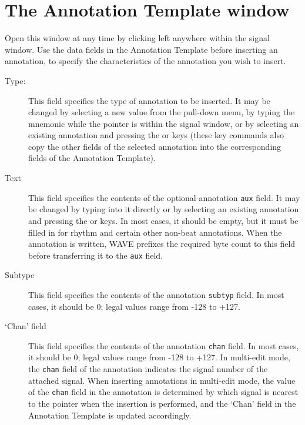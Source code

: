 \documentclass[twoside]{book}
\newcommand{\keycap}[1]{\cornersize{.5}\Ovalbox{\small\sf #1}}
\newcommand{\amenubutton}[1]{{\sf #1}~\keycap{\ensuremath{\nabla}}}
\newcommand{\WAVE}{{\sf WAVE}\xspace}
\begin{document}
\section{The {\sf Annotation Template} window}

\begin{figure}[h]
\centerline{}
\end{figure}
\label{sec:annotation-template-window}
Open this window at any time by clicking left anywhere within the
signal window.  Use the data fields in the {\sf Annotation Template}
before inserting an annotation, to specify the characteristics of the
annotation you wish to insert.

\begin{description}
\item[\amenubutton{Type:}]
This field specifies the type of annotation to be inserted.  It may be changed
by selecting a new value from the pull-down menu, by typing the mnemonic while
the pointer is within the signal window, or by selecting an existing annotation
and pressing the \keycap{Copy} or \keycap{F6} keys (these key commands also
copy the other fields of the selected annotation into the corresponding fields
of the {\sf Annotation Template}).

\item[{\sf Text}]
This field specifies the contents of the optional annotation {\tt aux} field.
It may be changed by typing into it directly or by selecting an existing
annotation and pressing the \keycap{Copy} or \keycap{F6} keys.  In most cases,
it should be empty, but it must be filled in for rhythm and certain other
non-beat annotations.  When the annotation is written, \WAVE{} prefixes the
required byte count to this field before transferring it to the {\tt aux}
field.

\item[{\sf Subtype}]
This field specifies the contents of the annotation {\tt subtyp} field.  In
most cases, it should be 0; legal values range from -128 to +127.

\item[{\sf `Chan' field}]
This field specifies the contents of the annotation {\tt chan} field.  In most
cases, it should be 0; legal values range from -128 to +127.  In multi-edit
mode, the {\tt chan} field of the annotation indicates the signal number of
the attached signal.  When inserting annotations in multi-edit mode, the value
of the {\tt chan} field in the annotation is determined by which signal is
nearest to the pointer when the insertion is performed, and the {\sf `Chan'
field} in the {\sf Annotation Template} is updated accordingly.


\end{description}
\end{document}
